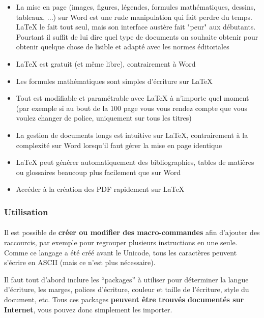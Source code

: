 \begin{itemize}
	\item La mise en page (images, figures, légendes, formules mathématiques,
		dessins, tableaux, ...) sur Word est une rude manipulation qui fait
		perdre du temps. \LaTeX{} le fait tout seul, mais son interface austère
		fait "peur" aux débutants. Pourtant il suffit de lui dire quel type de
		documents on souhaite obtenir pour obtenir quelque chose de lisible et
		adapté avec les normes éditoriales
	\item \LaTeX{} est gratuit (et même libre), contrairement à Word
	\item Les formules mathématiques sont simples d'écriture sur \LaTeX
	\item Tout est modifiable et paramétrable avec \LaTeX{} à n'importe quel
		moment (par exemple si au bout de la 100\ieme{} page vous vous rendez
		compte que vous voulez changer de police, uniquement sur tous les
		titres)
	\item La gestion de documents longs est intuitive sur \LaTeX ,
		contrairement à la complexité sur Word lorsqu'il faut gérer la mise en
		page identique
	\item \LaTeX{} peut générer automatiquement des bibliographies, tables de
		matières ou glossaires beaucoup plus facilement que sur Word
	\item Accéder à la création des PDF rapidement sur \LaTeX
\end{itemize}

\subsubsection{Utilisation}

\paragraph{} Il est possible de \textbf{créer ou modifier des macro-commandes}
afin d'ajouter des raccourcis, par exemple pour regrouper plusieurs
instructions en une seule. Comme ce langage a été créé avant le Unicode, tous
les caractères peuvent s'écrire en ASCII (mais ce n'est plus nécessaire).

Il faut tout d'abord inclure les ``packages'' à utiliser pour déterminer la
langue d’écriture, les marges, polices d’écriture, couleur et taille de
l’écriture, style du document, etc. Tous ces packages \textbf{peuvent être
trouvés documentés sur Internet}, vous pouvez donc simplement les importer.


